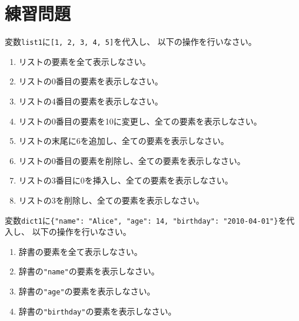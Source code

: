 \documentclass[a4paper,titlepage,dvipdfmx]{jarticle}
\begin{document}
\section{練習問題}
\begin{itembox}
  変数\texttt{list1}に\texttt{[1, 2, 3, 4, 5]}を代入し、
  以下の操作を行いなさい。
  \begin{enumerate}
    \item リストの要素を全て表示しなさい。
    \item リストの0番目の要素を表示しなさい。
    \item リストの4番目の要素を表示しなさい。
    \item リストの0番目の要素を10に変更し、全ての要素を表示しなさい。
    \item リストの末尾に6を追加し、全ての要素を表示しなさい。
    \item リストの0番目の要素を削除し、全ての要素を表示しなさい。
    \item リストの3番目に0を挿入し、全ての要素を表示しなさい。
    \item リストの3を削除し、全ての要素を表示しなさい。
  \end{enumerate}
\end{itembox}
\begin{itembox}
  変数\texttt{dict1}に\texttt{\{"name": "Alice", "age": 14, "birthday": "2010-04-01"\}}を代入し、
  以下の操作を行いなさい。
  \begin{enumerate}
    \item 辞書の要素を全て表示しなさい。
    \item 辞書の\texttt{"name"}の要素を表示しなさい。
    \item 辞書の\texttt{"age"}の要素を表示しなさい。
    \item 辞書の\texttt{"birthday"}の要素を表示しなさい。
  \end{enumerate}
\end{itembox}
\end{document}
